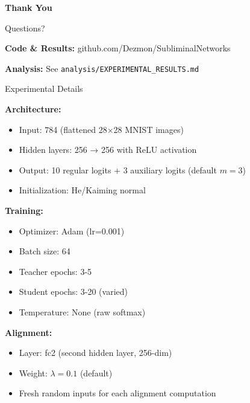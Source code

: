 \documentclass{beamer}
\begin{document}
\begin{frame}[plain]
\centering
\Huge \textbf{Thank You}

\vspace{2em}

\Large Questions?

\vspace{2em}

\normalsize
\textbf{Code \& Results:} github.com/Dezmon/SubliminalNetworks

\textbf{Analysis:} See \texttt{analysis/EXPERIMENTAL\_RESULTS.md}
\end{frame}


\appendix

\begin{frame}[allowframebreaks]{Experimental Details}

\textbf{Architecture:}
\begin{itemize}
    \item Input: 784 (flattened 28×28 MNIST images)
    \item Hidden layers: 256 → 256 with ReLU activation
    \item Output: 10 regular logits + 3 auxiliary logits (default $m=3$)
    \item Initialization: He/Kaiming normal
\end{itemize}

\vspace{0.5em}

\textbf{Training:}
\begin{itemize}
    \item Optimizer: Adam (lr=0.001)
    \item Batch size: 64
    \item Teacher epochs: 3-5
    \item Student epochs: 3-20 (varied)
    \item Temperature: None (raw softmax)
\end{itemize}

\vspace{0.5em}

\textbf{Alignment:}
\begin{itemize}
    \item Layer: fc2 (second hidden layer, 256-dim)
    \item Weight: $\lambda = 0.1$ (default)
    \item Fresh random inputs for each alignment computation
\end{itemize}

\end{frame}
\end{document}
